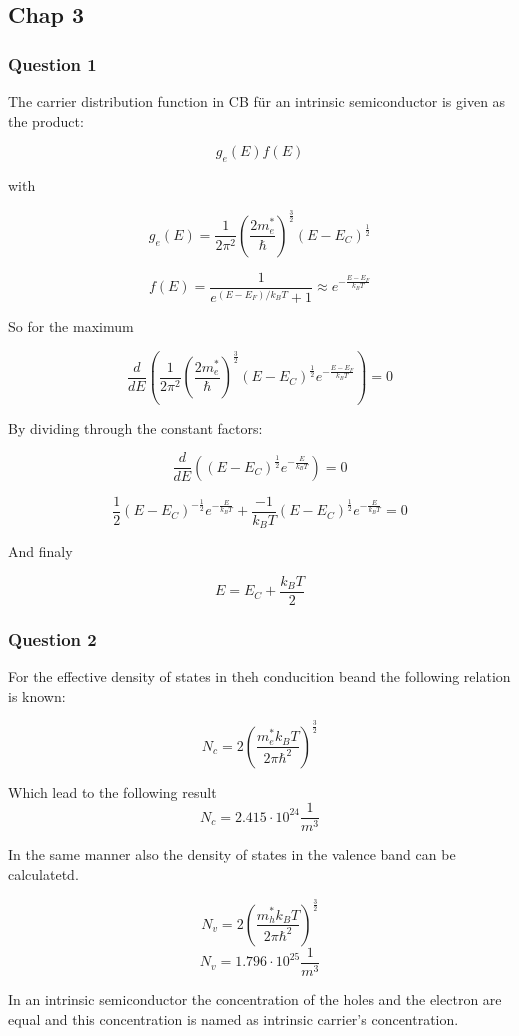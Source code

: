 \subsection{Chap 3} \label{chap3}

\subsubsection*{Question 1}
The carrier distribution function in CB für an intrinsic semiconductor
is given as the product:

$$g_e(E) f(E)$$

with

$$g_e(E) = \frac{1}{2\pi^2} \left( \frac{2m_e^*}{\hbar} \right)^\frac{3}{2} (E-E_C)^\frac{1}{2}$$

$$f(E) = \frac{1}{e^{(E-E_F)/k_BT}+1}  \approx e^{-\frac{E-E_F}{k_BT}}$$

So for the maximum 

$$\frac{d}{dE} \left(\frac{1}{2\pi^2} \left( \frac{2m_e^*}{\hbar} \right)^\frac{3}{2} (E-E_C)^\frac{1}{2} e^{-\frac{E-E_F}{k_BT}} \right) = 0$$

By dividing through the constant factors:

$$\frac{d}{dE} \left( (E-E_C)^\frac{1}{2} e^{-\frac{E}{k_BT}} \right) = 0$$

$$\frac{1}{2} (E-E_C)^{-\frac{1}{2}} e^{-\frac{E}{k_BT}} + \frac{-1}{k_BT} (E-E_C)^\frac{1}{2} e^{-\frac{E}{k_BT}} = 0$$

And finaly

$$E = E_C + \frac{k_BT}{2}$$


\subsubsection*{Question 2}

For the effective density of states in theh conducition beand 
the following relation is known:

$$ N_c = 2 \left( \frac{m_e^*k_BT}{2\pi\hbar^2}\right)^{\frac{3}{2}}$$

Which lead to the following result
$$ N_c = 2.415 \cdot 10^{24} \frac{1}{m^3}$$

In the same manner also the density of states in the valence band can be
calculatetd.

$$ N_v = 2 \left( \frac{m_h^*k_BT}{2\pi\hbar^2}\right)^{\frac{3}{2}}$$
$$ N_v = 1.796 \cdot 10^{25} \frac{1}{m^3}$$

In an intrinsic semiconductor the concentration of the holes and the 
electron are equal and this concentration is named as
intrinsic carrier's concentration. 

